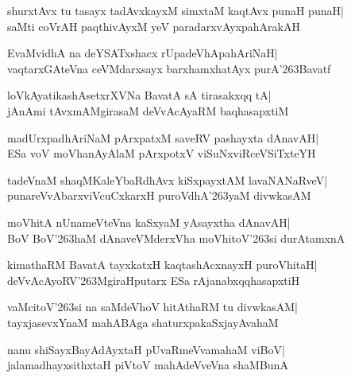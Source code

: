 \documentclass[twoside,12pt,openright]{book}
\def\S{\char'263}
\newcounter{shloka}[chapter]
\begin{document}
\begin{shloka}%
shurxtAvx tu tasayx tadAvxkayxM simxtaM kaqtAvx punaH punaH|\\
saMti coVrAH paqthivAyxM yeV paradarxvAyxpahArakAH
\end{shloka}

\begin{shloka}%
EvaMvidhA na deYSATxshacx rUpadeVhApahAriNaH|\\
vaqtarxGAteVna ceVMdarxsayx barxhamxhatAyx purA\S Bavatf
\end{shloka}

\begin{shloka}%
loVkAyatikashAsetxrXVNa BavatA sA tirasakxqq tA|\\
jAnAmi tAvxmAMgirasaM deVvAcAyaRM baqhasapxtiM 
\end{shloka}

\begin{shloka}%
madUrxpadhAriNaM pArxpatxM saveRV pashayxta dAnavAH|\\
ESa voV moVhanAyAlaM pArxpotxV viSuNxviRceVSiTxteYH
\end{shloka}

\begin{shloka}%
tadeVnaM shaqMKaleYbaRdhAvx kiSxpayxtAM lavaNANaRveV|\\
punareVvAbarxviVcuCxkarxH puroVdhA\S yaM divwkasAM
\end{shloka}

\begin{shloka}%
moVhitA nUnameVteVna kaSxyaM yAsayxtha dAnavAH|\\
BoV BoV\S haM dAnaveVMderxVha moVhitoV\S si durAtamxnA
\end{shloka}

\begin{shloka}%
kimathaRM BavatA tayxkatxH kaqtashAcxnayxH puroVhitaH|\\
deVvAcAyoRV\S MgiraHputarx ESa rAjanabxqqhasapxtiH
\end{shloka}

\begin{shloka}%
vaMcitoV\S si na saMdeVhoV hitAthaRM tu divwkasAM|\\
tayxjasevxYnaM mahABAga shaturxpakaSxjayAvahaM
\end{shloka}

\begin{shloka}%
nanu shiSayxBayAdAyxtaH pUvaRmeVvamahaM viBoV|\\
jalamadhayxsithxtaH piVtoV mahAdeVveVna shaMBunA
\end{shloka}
\end{document}
